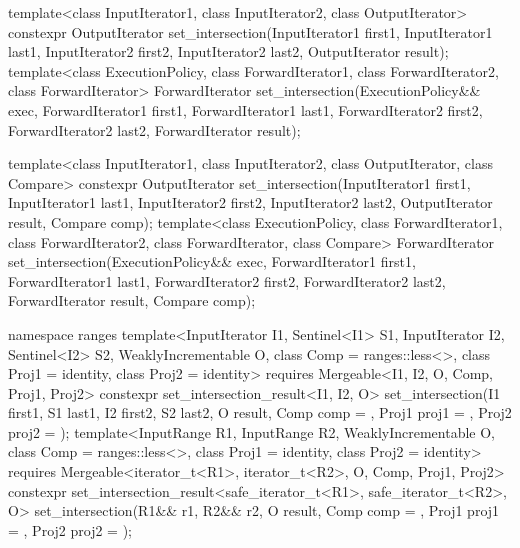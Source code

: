 %
\begin{itemdecl}
template<class InputIterator1, class InputIterator2,
         class OutputIterator>
  constexpr OutputIterator
    set_intersection(InputIterator1 first1, InputIterator1 last1,
                     InputIterator2 first2, InputIterator2 last2,
                     OutputIterator result);
template<class ExecutionPolicy, class ForwardIterator1, class ForwardIterator2,
         class ForwardIterator>
  ForwardIterator
    set_intersection(ExecutionPolicy&& exec,
                     ForwardIterator1 first1, ForwardIterator1 last1,
                     ForwardIterator2 first2, ForwardIterator2 last2,
                     ForwardIterator result);

template<class InputIterator1, class InputIterator2,
         class OutputIterator, class Compare>
  constexpr OutputIterator
    set_intersection(InputIterator1 first1, InputIterator1 last1,
                     InputIterator2 first2, InputIterator2 last2,
                     OutputIterator result, Compare comp);
template<class ExecutionPolicy, class ForwardIterator1, class ForwardIterator2,
         class ForwardIterator, class Compare>
  ForwardIterator
    set_intersection(ExecutionPolicy&& exec,
                     ForwardIterator1 first1, ForwardIterator1 last1,
                     ForwardIterator2 first2, ForwardIterator2 last2,
                     ForwardIterator result, Compare comp);

namespace ranges {
  template<InputIterator I1, Sentinel<I1> S1, InputIterator I2, Sentinel<I2> S2,
      WeaklyIncrementable O, class Comp = ranges::less<>, class Proj1 = identity, class Proj2 = identity>
    requires Mergeable<I1, I2, O, Comp, Proj1, Proj2>
    constexpr set_intersection_result<I1, I2, O>
      set_intersection(I1 first1, S1 last1, I2 first2, S2 last2, O result,
                       Comp comp = {}, Proj1 proj1 = {}, Proj2 proj2 = {});
  template<InputRange R1, InputRange R2, WeaklyIncrementable O,
      class Comp = ranges::less<>, class Proj1 = identity, class Proj2 = identity>
    requires Mergeable<iterator_t<R1>, iterator_t<R2>, O, Comp, Proj1, Proj2>
    constexpr set_intersection_result<safe_iterator_t<R1>, safe_iterator_t<R2>, O>
      set_intersection(R1&& r1, R2&& r2, O result,
                       Comp comp = {}, Proj1 proj1 = {}, Proj2 proj2 = {});
}
\end{itemdecl}


